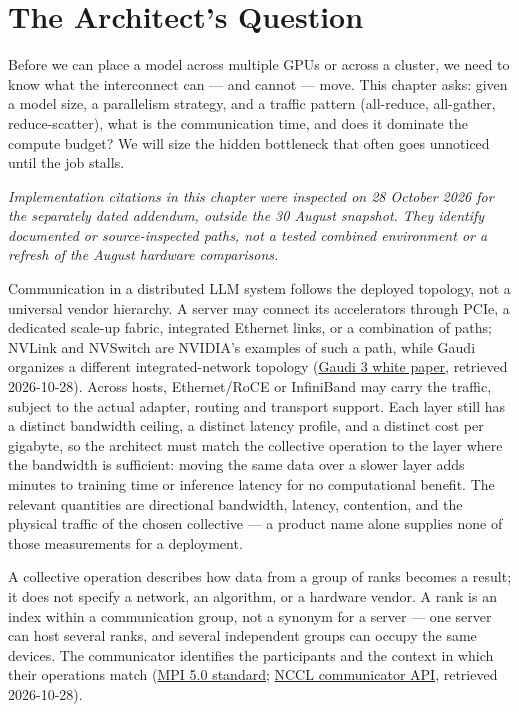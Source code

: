 \section*{The Architect's Question}\label{the-architects-question}

Before we can place a model across multiple GPUs or across a cluster, we
need to know what the interconnect can --- and cannot --- move. This
chapter asks: given a model size, a parallelism strategy, and a traffic
pattern (all-reduce, all-gather, reduce-scatter), what is the
communication time, and does it dominate the compute budget? We will
size the hidden bottleneck that often goes unnoticed until the job
stalls.

\label{concept}


\emph{Implementation citations in this chapter were inspected on 28
October 2026 for the separately dated addendum, outside the 30 August
snapshot. They identify documented or source-inspected paths, not a
tested combined environment or a refresh of the August hardware
comparisons.}

Communication in a distributed LLM system follows the deployed topology,
not a universal vendor hierarchy. A server may connect its accelerators
through PCIe, a dedicated scale-up fabric, integrated Ethernet links, or
a combination of paths; NVLink and NVSwitch are NVIDIA's examples of
such a path, while Gaudi organizes a different integrated-network
topology
(\href{https://cdrdv2-public.intel.com/817486/gaudi-3-ai-accelerator-white-paper.pdf}{Gaudi
3 white paper}, retrieved 2026-10-28). Across hosts, Ethernet/RoCE or
InfiniBand may carry the traffic, subject to the actual adapter, routing
and transport support. Each layer still has a distinct bandwidth
ceiling, a distinct latency profile, and a distinct cost per gigabyte,
so the architect must match the collective operation to the layer where
the bandwidth is sufficient: moving the same data over a slower layer
adds minutes to training time or inference latency for no computational
benefit. The relevant quantities are directional bandwidth, latency,
contention, and the physical traffic of the chosen collective --- a
product name alone supplies none of those measurements for a deployment.

A collective operation describes how data from a group of ranks becomes
a result; it does not specify a network, an algorithm, or a hardware
vendor. A rank is an index within a communication group, not a synonym
for a server --- one server can host several ranks, and several
independent groups can occupy the same devices. The communicator
identifies the participants and the context in which their operations
match
(\href{https://www.mpi-forum.org/docs/mpi-5.0/mpi50-report.pdf}{MPI 5.0
standard};
\href{https://docs.nvidia.com/deeplearning/nccl/user-guide/docs/api/comms.html}{NCCL
communicator API}, retrieved 2026-10-28).

